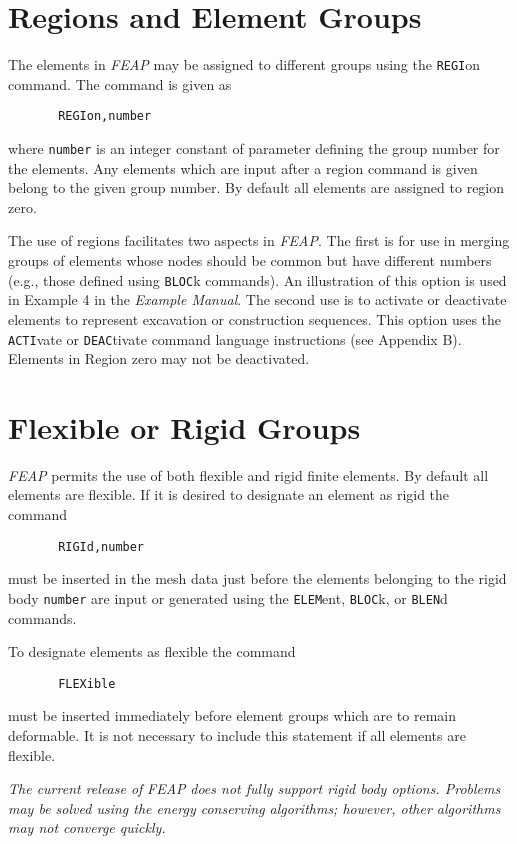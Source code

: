 \section{Regions and Element Groups}
\label{regions}

The elements in {\sl FEAP} may be assigned to different groups using the
{\tt REGI}\-on command.  The command is given as
\begin{verbatim}
       REGIon,number
\end{verbatim}
where {\tt number} is an integer constant of parameter defining the group
number for the elements.
Any elements which are input after a region command is given belong
to the given group number.
By default all elements are assigned to region zero.

The use of regions facilitates two aspects in {\sl FEAP}.  The first is
for use in merging groups of elements whose nodes should be common
but have different numbers (e.g., those defined using {\tt BLOC}k commands).
An illustration of this option is used in Example 4 in the {\sl Example Manual}.
The second use is to activate or deactivate elements to represent excavation
or construction sequences.  This option uses the {\tt ACTI}vate or
{\tt DEAC}tivate command language instructions (see Appendix B).
Elements in Region zero may not be deactivated.

\section{Flexible or Rigid Groups}
\label{flexrigid}

{\sl FEAP} permits the use of both flexible and rigid finite elements.
By default all elements are flexible.  If it is desired to designate an
element as rigid the command
\begin{verbatim}
       RIGId,number
\end{verbatim}
must be inserted in the mesh data just before the elements belonging to the
rigid body {\tt number} are input or generated using the {\tt ELEM}ent,
{\tt BLOC}k, or {\tt BLEN}d commands.

To designate elements as flexible the command
\begin{verbatim}
       FLEXible
\end{verbatim}
must be inserted immediately before element groups which are to remain
deformable.
It is not necessary to include this statement if all elements are flexible.

{\it The current release of} {\sl FEAP} {\it does not fully support
rigid body options.  Problems may be solved using the energy conserving
algorithms; however, other algorithms may not converge quickly.}
